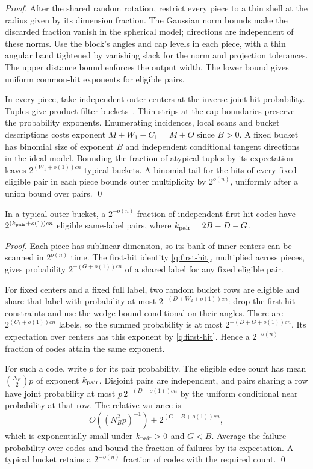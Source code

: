 \documentclass[runningheads,envcountsame,envcountsect,orivec]{llncs}
\begin{document}
\begin{proof}
After the shared random rotation, restrict every piece to
a thin shell at the radius given by its dimension fraction.
The Gaussian norm bounds make the discarded fraction
vanish in the spherical model; directions are independent
of these norms. Use the block's angles and cap levels in
each piece, with a thin angular band tightened by vanishing
slack for the norm and projection tolerances. The upper
distance bound enforces the output width. The lower bound
gives uniform common-hit exponents for eligible pairs.

In every piece, take independent outer centers at the
inverse joint-hit probability. Tuples give product-filter
buckets~\cite[Section~5]{BDGL16}. Thin strips at the cap
boundaries preserve the probability exponents. Enumerating
incidences, local scans and bucket descriptions costs
exponent $M+W_1-C_1=M+O$ since $B>0$.
A fixed bucket has binomial size of exponent $B$ and
independent conditional tangent directions in the ideal
model. Bounding the fraction of atypical tuples by its
expectation leaves $2^{(W_1+o(1))cn}$ typical buckets.
A binomial tail for the hits of every fixed eligible pair
in each piece bounds outer multiplicity by $2^{o(n)}$,
uniformly after a union bound over pairs.
\qed
\end{proof}

\begin{lemma}
\label{lem:inner-pair-concentration}
In a typical outer bucket, a $2^{-o(n)}$ fraction of
independent first-hit codes have
$2^{(k_{\rm pair}+o(1))cn}$ eligible same-label pairs,
where $k_{\rm pair}=2B-D-G$.
\end{lemma}

\begin{proof}
Each piece has sublinear dimension, so its bank of inner
centers can be scanned in $2^{o(n)}$ time. The first-hit
identity \eqref{q:first-hit}, multiplied across pieces,
gives probability $2^{-(G+o(1))cn}$ of a shared label
for any fixed eligible pair.

For fixed centers and a fixed full label, two random
bucket rows are eligible and share that label with
probability at most $2^{-(D+W_2+o(1))cn}$: drop the
first-hit constraints and use the wedge bound conditional
on their angles. There are $2^{(C_2+o(1))cn}$ labels,
so the summed probability is at most
$2^{-(D+G+o(1))cn}$. Its expectation over centers has
this exponent by \eqref{q:first-hit}. Hence a
$2^{-o(n)}$ fraction of codes attain the same exponent.

For such a code, write $p$ for its pair probability.
The eligible edge count has mean $\binom{N_B}{2}p$
of exponent $k_{\rm pair}$. Disjoint pairs are independent,
and pairs sharing a row have joint probability at most
$p\,2^{-(D+o(1))cn}$ by the uniform conditional near
probability at that row. The relative variance is
\[
 O((N_B^2p)^{-1})+2^{(G-B+o(1))cn},
\]
which is exponentially small under $k_{\rm pair}>0$
and $G<B$. Average the failure probability over codes
and bound the fraction of failures by its expectation. A typical bucket retains
a $2^{-o(n)}$ fraction of codes with the required count.
\qed
\end{proof}
\end{document}

